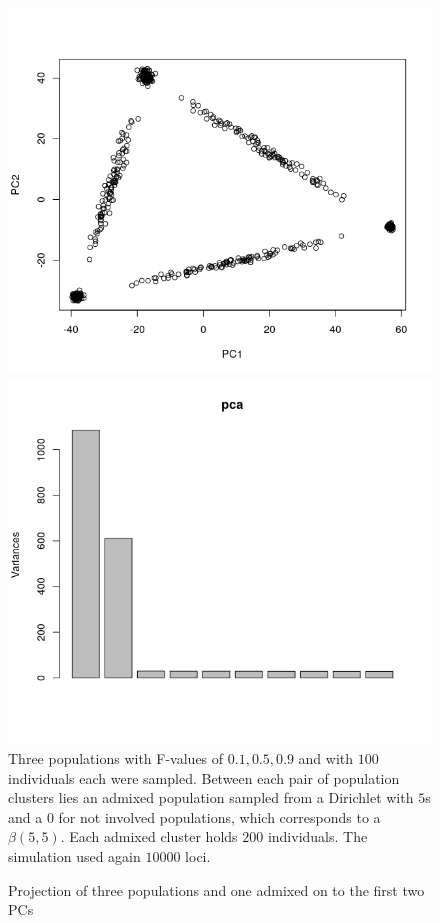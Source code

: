 \documentclass[a4paper, 11pt]{article}
\begin{document}
\begin{figure}[h!]
\caption{Projection of three populations and one admixed on to the first two PCs}
\includegraphics[scale=0.47]{Rplot_admixed_simplex}
\includegraphics[scale=0.45]{Rplot_eigenvalues_simplex}
Three populations with F-values  of $0.1, 0.5, 0.9$ and with $100$ individuals each were sampled. Between each pair of population clusters lies an admixed population sampled from a Dirichlet with $5$s and a $0$ for not involved populations, which corresponds to a $\beta(5, 5)$. Each admixed cluster holds $200$ individuals. The simulation used again $10000$ loci.
\end{figure}
\end{document}
